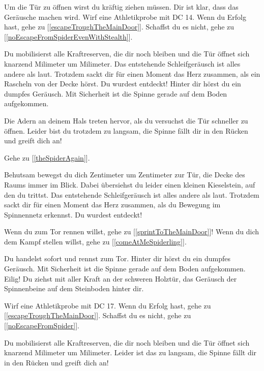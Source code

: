 Um die Tür zu öffnen wirst du kräftig ziehen müssen. Dir ist klar, dass das Geräusche machen wird. Wirf eine Athletikprobe mit DC 14. Wenn du Erfolg hast, gehe zu [\ref{escapeTroughTheMainDoor}]. Schaffst du es nicht, gehe zu [\ref{noEscapeFromSpiderEvenWithStealth}].


Du mobilisierst alle Kraftreserven, die dir noch bleiben und die Tür öffnet sich knarzend Milimeter um Milimeter. Das entstehende Schleifgeräusch ist alles andere als laut. Trotzdem sackt dir für einen Moment das Herz zusammen, als ein Rascheln von der Decke hörst. Du wurdest entdeckt! Hinter dir hörst du ein dumpfes Geräusch. Mit Sicherheit ist die Spinne gerade auf dem Boden aufgekommen.

Die Adern an deinem Hals treten hervor, als du versuchst die Tür schneller zu öffnen.
Leider bist du trotzdem zu langsam, die Spinne fällt dir in den Rücken und greift dich an!

Gehe zu [\ref{theSpiderAgain}].


Behutsam bewegst du dich Zentimeter um Zentimeter zur Tür, die Decke des Raums immer im Blick. Dabei übersiehst du leider einen kleinen Kieselstein, auf den du trittst. Das entstehende Schleifgeräusch ist alles andere als laut. Trotzdem sackt dir für einen Moment das Herz zusammen, als du Bewegung im Spinnennetz erkennst. Du wurdest entdeckt!

Wenn du zum Tor rennen willst, gehe zu [\ref{sprintToTheMainDoor}]!
Wenn du dich dem Kampf stellen willst, gehe zu [\ref{comeAtMeSpiderling}].


Du handelst sofort und rennst zum Tor. Hinter dir hörst du ein dumpfes Geräusch. Mit Sicherheit ist die Spinne gerade auf dem Boden aufgekommen. Eilig! Du ziehst mit aller Kraft an der schweren Holztür, das Geräusch der Spinnenbeine auf dem Steinboden hinter dir.

Wirf eine Athletikprobe mit DC 17. Wenn du Erfolg hast, gehe zu [\ref{escapeTroughTheMainDoor}]. Schaffst du es nicht, gehe zu [\ref{noEscapeFromSpider}].


Du mobilisierst alle Kraftreserven, die dir noch bleiben und die Tür öffnet sich knarzend Milimeter um Milimeter. Leider ist das zu langsam, die Spinne fällt dir in den Rücken und greift dich an!

